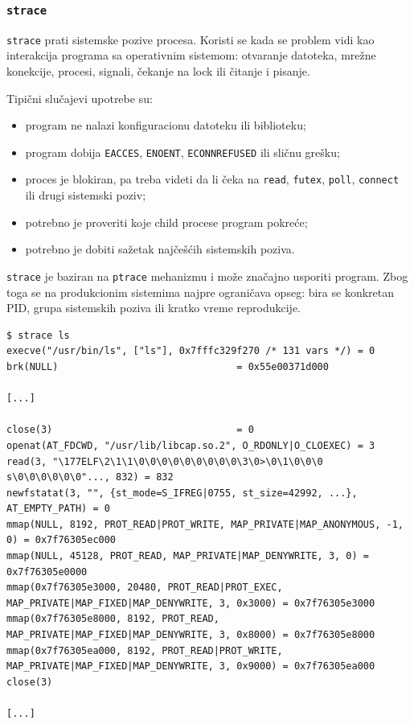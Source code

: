 \subsubsection{\texorpdfstring{\texttt{strace}}{strace}}\label{strace}

\texttt{strace} prati sistemske pozive procesa. Koristi se kada se problem vidi kao interakcija programa sa operativnim sistemom: otvaranje datoteka, mrežne konekcije, procesi, signali, čekanje na lock ili čitanje i pisanje.

Tipični slučajevi upotrebe su:

\begin{itemize}
\tightlist
\item
  program ne nalazi konfiguracionu datoteku ili biblioteku;
\item
  program dobija \texttt{EACCES}, \texttt{ENOENT}, \texttt{ECONNREFUSED} ili sličnu grešku;
\item
  proces je blokiran, pa treba videti da li čeka na \texttt{read}, \texttt{futex}, \texttt{poll}, \texttt{connect} ili drugi sistemski poziv;
\item
  potrebno je proveriti koje child procese program pokreće;
\item
  potrebno je dobiti sažetak najčešćih sistemskih poziva.
\end{itemize}

\texttt{strace} je baziran na \texttt{ptrace} mehanizmu i može značajno usporiti program. Zbog toga se na produkcionim sistemima najpre ograničava opseg: bira se konkretan PID, grupa sistemskih poziva ili kratko vreme reprodukcije.

\begin{verbatim}
$ strace ls
execve("/usr/bin/ls", ["ls"], 0x7fffc329f270 /* 131 vars */) = 0
brk(NULL)                               = 0x55e00371d000

[...]

close(3)                                = 0
openat(AT_FDCWD, "/usr/lib/libcap.so.2", O_RDONLY|O_CLOEXEC) = 3
read(3, "\177ELF\2\1\1\0\0\0\0\0\0\0\0\0\3\0>\0\1\0\0\0 s\0\0\0\0\0\0"..., 832) = 832
newfstatat(3, "", {st_mode=S_IFREG|0755, st_size=42992, ...}, AT_EMPTY_PATH) = 0
mmap(NULL, 8192, PROT_READ|PROT_WRITE, MAP_PRIVATE|MAP_ANONYMOUS, -1, 0) = 0x7f76305ec000
mmap(NULL, 45128, PROT_READ, MAP_PRIVATE|MAP_DENYWRITE, 3, 0) = 0x7f76305e0000
mmap(0x7f76305e3000, 20480, PROT_READ|PROT_EXEC, MAP_PRIVATE|MAP_FIXED|MAP_DENYWRITE, 3, 0x3000) = 0x7f76305e3000
mmap(0x7f76305e8000, 8192, PROT_READ, MAP_PRIVATE|MAP_FIXED|MAP_DENYWRITE, 3, 0x8000) = 0x7f76305e8000
mmap(0x7f76305ea000, 8192, PROT_READ|PROT_WRITE, MAP_PRIVATE|MAP_FIXED|MAP_DENYWRITE, 3, 0x9000) = 0x7f76305ea000
close(3)

[...]
\end{verbatim}


